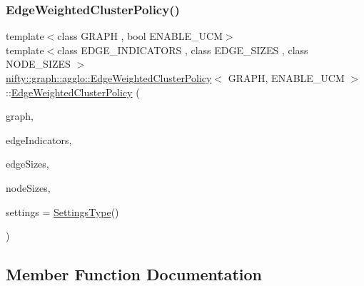 \subsubsection{\texorpdfstring{Edge\+Weighted\+Cluster\+Policy()}{EdgeWeightedClusterPolicy()}}
{\footnotesize\ttfamily template$<$class G\+R\+A\+PH , bool E\+N\+A\+B\+L\+E\+\_\+\+U\+CM$>$ \\
template$<$class E\+D\+G\+E\+\_\+\+I\+N\+D\+I\+C\+A\+T\+O\+RS , class E\+D\+G\+E\+\_\+\+S\+I\+Z\+ES , class N\+O\+D\+E\+\_\+\+S\+I\+Z\+ES $>$ \\
\hyperlink{classnifty_1_1graph_1_1agglo_1_1EdgeWeightedClusterPolicy}{nifty\+::graph\+::agglo\+::\+Edge\+Weighted\+Cluster\+Policy}$<$ G\+R\+A\+PH, E\+N\+A\+B\+L\+E\+\_\+\+U\+CM $>$\+::\hyperlink{classnifty_1_1graph_1_1agglo_1_1EdgeWeightedClusterPolicy}{Edge\+Weighted\+Cluster\+Policy} (\begin{DoxyParamCaption}\item[{const \hyperlink{classnifty_1_1graph_1_1agglo_1_1EdgeWeightedClusterPolicy_a8e910f7b9d0c1baa1de7b6b1c3e58397}{Graph\+Type} \&}]{graph,  }\item[{const E\+D\+G\+E\+\_\+\+I\+N\+D\+I\+C\+A\+T\+O\+RS \&}]{edge\+Indicators,  }\item[{const E\+D\+G\+E\+\_\+\+S\+I\+Z\+ES \&}]{edge\+Sizes,  }\item[{const N\+O\+D\+E\+\_\+\+S\+I\+Z\+ES \&}]{node\+Sizes,  }\item[{const \hyperlink{classnifty_1_1graph_1_1agglo_1_1EdgeWeightedClusterPolicy_a6c9e2acec086a9fcc4391f067a4ded46}{Settings\+Type} \&}]{settings = {\ttfamily \hyperlink{classnifty_1_1graph_1_1agglo_1_1EdgeWeightedClusterPolicy_a6c9e2acec086a9fcc4391f067a4ded46}{Settings\+Type}()} }\end{DoxyParamCaption})\hspace{0.3cm}{\ttfamily [inline]}}



\subsection{Member Function Documentation}
\mbox{\label{classnifty_1_1graph_1_1agglo_1_1EdgeWeightedClusterPolicy_ab17fb3b1739432d2263366d2a3f0800c}} 
